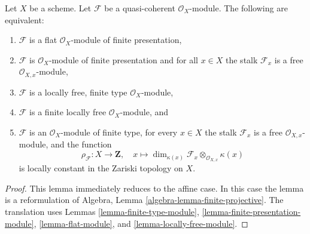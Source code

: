 \begin{lemma}
\label{lemma-finite-locally-free}
Let $X$ be a scheme.
Let $\mathcal{F}$ be a quasi-coherent $\mathcal{O}_X$-module.
The following are equivalent:
\begin{enumerate}
\item $\mathcal{F}$ is a flat $\mathcal{O}_X$-module of finite presentation,
\item $\mathcal{F}$ is $\mathcal{O}_X$-module of finite presentation and
for all $x \in X$ the stalk $\mathcal{F}_x$ is a free
$\mathcal{O}_{X, x}$-module,
\item $\mathcal{F}$ is a locally free, finite type $\mathcal{O}_X$-module,
\item $\mathcal{F}$ is a finite locally free $\mathcal{O}_X$-module, and
\item $\mathcal{F}$ is an $\mathcal{O}_X$-module of finite type,
for every $x \in X$ the stalk $\mathcal{F}_x$ is a free
$\mathcal{O}_{X, x}$-module, and the function
$$
\rho_\mathcal{F} : X \to \mathbf{Z}, \quad
x \longmapsto
\dim_{\kappa(x)} \mathcal{F}_x \otimes_{\mathcal{O}_{X, x}} \kappa(x)
$$
is locally constant in the Zariski topology on $X$.
\end{enumerate}
\end{lemma}

\begin{proof}
This lemma immediately reduces to the affine case.
In this case the lemma is a reformulation of
Algebra, Lemma \ref{algebra-lemma-finite-projective}.
The translation uses
Lemmas \ref{lemma-finite-type-module},
\ref{lemma-finite-presentation-module},
\ref{lemma-flat-module}, and
\ref{lemma-locally-free-module}.
\end{proof}
